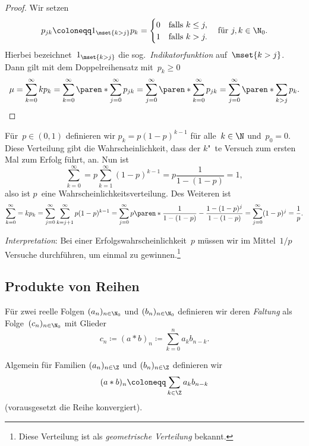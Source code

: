 \documentclass[a4paper]{article}
\begin{document}
\begin{proof}
    Wir setzen
    \begin{equation*}
        p_{jk} \coloneqq 1_{\mset{k>j}} p_k = \begin{cases}
            0 & \text{falls } k \leq j, \\
            1 & \text{falls } k > j.
        \end{cases} \quad\text{für } j,k \in \N_0.
    \end{equation*}
    Hierbei bezeichnet~$1_{\mset{k>j}}$ die sog.\ \emph{Indikatorfunktion} auf~$\mset{k > j}$. Dann gilt mit dem Doppelreihensatz mit~$p_k \geq 0$
    \begin{equation*}
        \mu = \sum_{k=0}^\infty kp_k = \sum_{k=0}^\infty \paren*{\sum_{j=0}^\infty p_{jk}} = \sum_{j=0}^\infty \paren*{\sum_{k=0}^\infty p_{jk}} = \sum_{j=0}^\infty \paren*{\sum_{k>j} p_k}. \qedhere
    \end{equation*}
\end{proof}

\begin{example}
    Für~$p \in (0, 1)$ definieren wir $p_k = p(1-p)^{k-1}$ für alle~$k \in \N$ und~$p_0 = 0$. Diese Verteilung gibt die Wahrscheinlichkeit, dass der $k$"~te Versuch zum ersten Mal zum Erfolg führt, an. Nun ist
    \begin{equation*}
        \sum_{k=0}^\infty = p \sum_{k=1}^\infty (1-p)^{k-1} = p \frac{1}{1-(1-p)} = 1,
    \end{equation*}
    also ist $p$~eine Wahrscheinlichkeitsverteilung. Des Weiteren ist
    \begin{equation*}
        \sum_{k=0}^\infty = kp_k = \sum_{j=0}^\infty \sum_{k=j+1}^\infty p(1-p)^{k-1} = \sum_{j=0}^\infty p\paren*{\frac{1}{1-(1-p)} - \frac{1-(1-p)^j}{1-(1-p)}} = \sum_{j=0}^\infty (1-p)^j = \frac{1}{p}.
    \end{equation*}

    \emph{Interpretation}: Bei einer Erfolgswahrscheinlichkeit~$p$ müssen wir im Mittel~$1/p$ Versuche durchführen, um einmal zu gewinnen.\footnote{Diese Verteilung ist als \emph{geometrische Verteilung} bekannt.}
\end{example}

\subsection{Produkte von Reihen}

\begin{definition}
    Für zwei reelle Folgen $(a_n)_{n\in\N_0}$ und $(b_n)_{n\in\N_0}$ definieren wir deren \emph{Faltung} als Folge~$(c_n)_{n\in\N_0}$ mit Glieder
    \begin{equation*}
        c_n \coloneqq (a*b)_n \coloneqq \sum_{k=0}^n a_k b_{n-k}.
    \end{equation*}

    Algemein für Familien $(a_n)_{n\in\Z}$ und $(b_n)_{n\in\Z}$ definieren wir
    \begin{equation*}
        (a*b)_n \coloneqq \sum_{k\in\Z} a_k b_{n-k}
    \end{equation*}
    (vorausgesetzt die Reihe konvergiert).
\end{definition}
\end{document}
